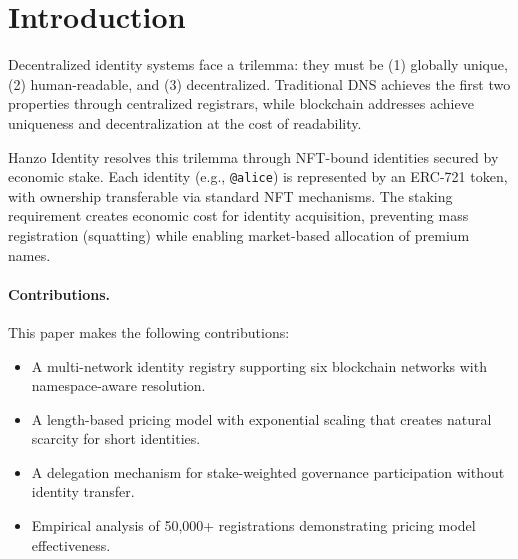 \section{Introduction}


Decentralized identity systems face a trilemma: they must be (1) globally unique, (2) human-readable, and (3) decentralized. Traditional DNS achieves the first two properties through centralized registrars, while blockchain addresses achieve uniqueness and decentralization at the cost of readability.

Hanzo Identity resolves this trilemma through NFT-bound identities secured by economic stake. Each identity (e.g., \texttt{@alice}) is represented by an ERC-721 token, with ownership transferable via standard NFT mechanisms. The staking requirement creates economic cost for identity acquisition, preventing mass registration (squatting) while enabling market-based allocation of premium names.

\paragraph{Contributions.} This paper makes the following contributions:
\begin{itemize}
    \item A multi-network identity registry supporting six blockchain networks with namespace-aware resolution.
    \item A length-based pricing model with exponential scaling that creates natural scarcity for short identities.
    \item A delegation mechanism for stake-weighted governance participation without identity transfer.
    \item Empirical analysis of 50,000+ registrations demonstrating pricing model effectiveness.
\end{itemize}

